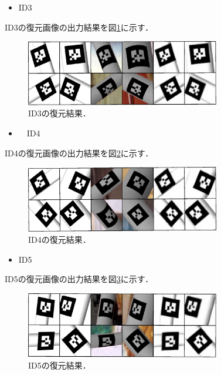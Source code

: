 \begin{itemize}
\item  ID3
\end{itemize}

ID3の復元画像の出力結果を図\ref{i3}に示す．

      \begin{figure}[htbp]
      \begin{center}
      \includegraphics[width=85mm]{figure/eps/F4.eps}
      \caption{ID3の復元結果．}
      \label{i3}
      \end{center}
      \end{figure}

\newpage

\begin{itemize}
\item　ID4
\end{itemize}

ID4の復元画像の出力結果を図\ref{i4}に示す．

      \begin{figure}[htbp]
      \begin{center}
      \includegraphics[width=85mm]{figure/eps/F5.eps}
      \caption{ID4の復元結果．}
      \label{i4}
      \end{center}
      \end{figure}


\begin{itemize}
\item  ID5
\end{itemize}

ID5の復元画像の出力結果を図\ref{i5}に示す．

      \begin{figure}[htbp]
      \begin{center}
      \includegraphics[width=85mm]{figure/eps/F6.eps}
      \caption{ID5の復元結果．}
      \label{i5}
      \end{center}
      \end{figure}



